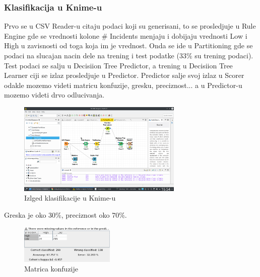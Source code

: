 \documentclass[11pt]{article} %
\begin{document}
	\subsubsection{Klasifikacija u Knime-u}
	Prvo se u CSV Reader-u citaju podaci koji su generisani, to se prosledjuje u Rule Engine gde se vrednosti kolone \# Incidents menjaju i dobijaju vrednosti Low 
	i High u zavisnosti od toga koja im je vrednost. Onda se ide u Partitioning gde se podaci na slucajan nacin dele na trening i 
	test podatke (33\% su trening podaci). Test podaci se salju u Decisiion Tree Predictor, a trening u Decisiion Tree Learner ciji se izlaz prosledjuje u 
	Predictor. Predictor salje svoj izlaz u Scorer odakle mozemo videti matricu konfuzije, gresku, preciznost... a u Predictor-u mozemo videti drvo odlucivanja.
	\begin{figure}[h!]
		\centering
		\includegraphics[width=0.7\textwidth]{klasifikacijaGradDrzavaKnime}
		\caption{Izlged klasifikacije u Knime-u}
	\end{figure}
	
	Greska je oko 30\%, preciznost oko 70\%.
	\begin{figure}[h!]
		\centering
		\includegraphics[width=0.4\textwidth]{klasifikacijaGradMatricaKonfuzije}
		\caption{Matrica konfuzije}
	\end{figure}
	
	
	
	
\end{document}
